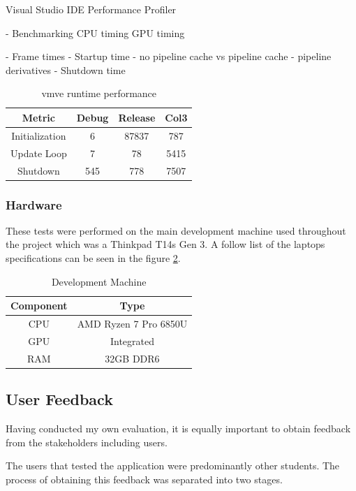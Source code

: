 \documentclass[11pt]{article}
\begin{document}
Visual Studio IDE Performance
Profiler

- Benchmarking
    CPU timing
    GPU timing


- Frame times
- Startup time
	- no pipeline cache vs pipeline cache
	- pipeline derivatives
- Shutdown time


\begin{table}[h!]
\centering
\begin{tabular}{||c c c c||} 
  \hline
  Metric & Debug & Release & Col3 \\ [0.5ex] 
  \hline\hline
  Initialization & 6 & 87837 & 787 \\ 
  Update Loop & 7 & 78 & 5415 \\
  Shutdown & 545 & 778 & 7507 \\ [1ex] 
  \hline
\end{tabular}
\caption{\gls{vmve} runtime performance}
\label{fig:runtime_performance}
\end{table}

\subsubsection{Hardware}
These tests were performed on the main development machine used throughout the
project which was a Thinkpad T14s Gen 3. A follow list of the laptops specifications
can be seen in the figure \ref{fig:development_machine}.

\begin{table}[h!]
\centering
\begin{tabular}{|| c c ||} 
  \hline
  Component & Type \\ [0.5ex] 
  \hline\hline
  CPU & AMD Ryzen 7 Pro 6850U  \\ 
  GPU & Integrated \\
  RAM & 32GB DDR6 \\ [1ex] 
  \hline
\end{tabular}
\caption{Development Machine}
\label{fig:development_machine}
\end{table}

\subsection{User Feedback}
Having conducted my own evaluation, it is equally important to obtain feedback
from the stakeholders including users.

The users that tested the application were predominantly other students. The
process of obtaining this feedback was separated into two stages.
\end{document}
